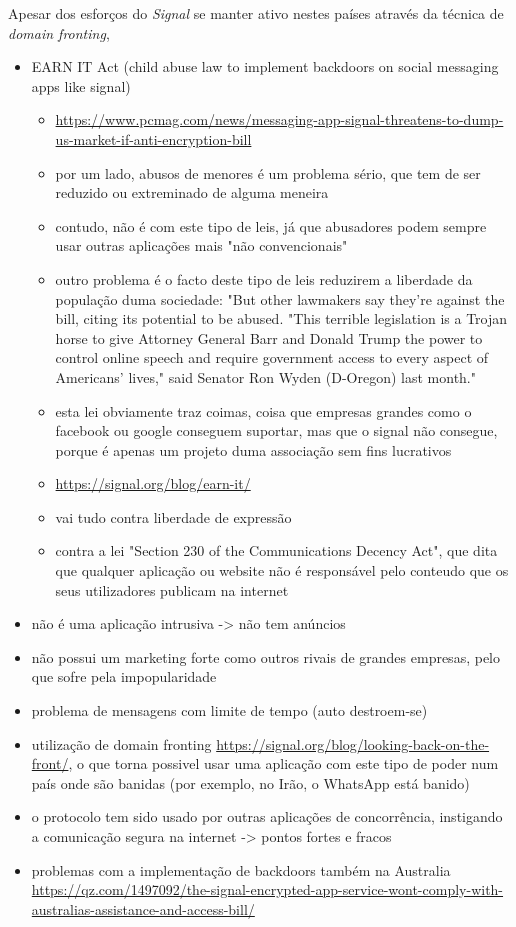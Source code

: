 Apesar dos esforços do \textit{Signal} se manter ativo nestes países através da técnica de \textit{domain fronting}, 

\begin{itemize}
   \item EARN IT Act (child abuse law to implement backdoors on social messaging apps like signal)
   \begin{itemize}
      \item \url{https://www.pcmag.com/news/messaging-app-signal-threatens-to-dump-us-market-if-anti-encryption-bill}
      \item por um lado, abusos de menores é um problema sério, que tem de ser reduzido ou extreminado de alguma meneira
      \item contudo, não é com este tipo de leis, já que abusadores podem sempre usar outras aplicações mais "não convencionais" 
      \item outro problema é o facto deste tipo de leis reduzirem a liberdade da população duma sociedade: "But other lawmakers say they're against the bill, citing its potential to be abused. "This terrible legislation is a Trojan horse to give Attorney General Barr and Donald Trump the power to control online speech and require government access to every aspect of Americans' lives," said Senator Ron Wyden (D-Oregon) last month."
      \item esta lei obviamente traz coimas, coisa que empresas grandes como o facebook ou google conseguem suportar, mas que o signal não consegue, porque é apenas um projeto duma associação sem fins lucrativos
      \item \url{https://signal.org/blog/earn-it/}
      \item vai tudo contra liberdade de expressão
      \item contra a lei "Section 230 of the Communications Decency Act", que dita que qualquer aplicação ou website não é responsável pelo conteudo que os seus utilizadores publicam na internet
   \end{itemize}
   \item não é uma aplicação intrusiva -> não tem anúncios
   \item não possui um marketing forte como outros rivais de grandes empresas, pelo que sofre pela impopularidade
   \item problema de mensagens com limite de tempo (auto destroem-se)
   \item utilização de domain fronting \url{https://signal.org/blog/looking-back-on-the-front/}, o que torna possivel usar uma aplicação com este tipo de poder num país onde são banidas (por exemplo, no Irão, o WhatsApp está banido)
   \item o protocolo tem sido usado por outras aplicações de concorrência, instigando a comunicação segura na internet -> pontos fortes e fracos
   \item problemas com a implementação de backdoors também na Australia \url{https://qz.com/1497092/the-signal-encrypted-app-service-wont-comply-with-australias-assistance-and-access-bill/}
\end{itemize}

